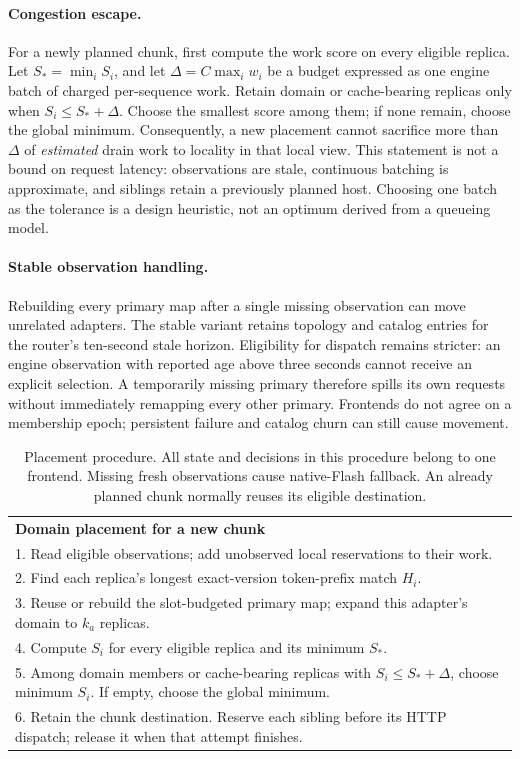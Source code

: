 \paragraph{Congestion escape.}
For a newly planned chunk, first compute the work score on every eligible
replica. Let $S_* = \min_i S_i$, and let
$\Delta=C\max_i w_i$ be a budget expressed as one engine batch of charged
per-sequence work. Retain domain or cache-bearing replicas only when
$S_i\le S_*+\Delta$. Choose the smallest score among them; if none remain,
choose the global minimum. Consequently, a new placement cannot sacrifice more
than $\Delta$ of \emph{estimated} drain work to locality in that local view.
This statement is not a bound on request latency: observations are stale,
continuous batching is approximate, and siblings retain a previously planned
host. Choosing one batch as the tolerance is a design heuristic, not an optimum
derived from a queueing model.

\paragraph{Stable observation handling.}
Rebuilding every primary map after a single missing observation can move
unrelated adapters. The stable variant retains topology and catalog entries for
the router's ten-second stale horizon. Eligibility for dispatch remains stricter:
an engine observation with reported age above three seconds cannot receive an explicit
selection. A temporarily missing primary therefore spills its own requests
without immediately remapping every other primary. Frontends do not agree on a
membership epoch; persistent failure and catalog churn can still cause movement.

\begin{table}[t]\small
\begin{tabular}{p{}}
\toprule
\textbf{Domain placement for a new chunk}\rule{0pt}{2.5ex}\\
1. Read eligible observations; add unobserved local reservations to their work.\\
2. Find each replica's longest exact-version token-prefix match $H_i$.\\
3. Reuse or rebuild the slot-budgeted primary map; expand this adapter's domain to $k_a$ replicas.\\
4. Compute $S_i$ for every eligible replica and its minimum $S_*$.\\
5. Among domain members or cache-bearing replicas with $S_i\le S_*+\Delta$, choose minimum $S_i$. If empty, choose the global minimum.\\
6. Retain the chunk destination. Reserve each sibling before its HTTP dispatch; release it when that attempt finishes.\\
\bottomrule
\end{tabular}
\caption{Placement procedure. All state and decisions in this procedure belong
to one frontend. Missing fresh observations cause native-Flash fallback.
An already planned chunk normally reuses its eligible destination.}
\label{tab:algorithm}
\end{table}

